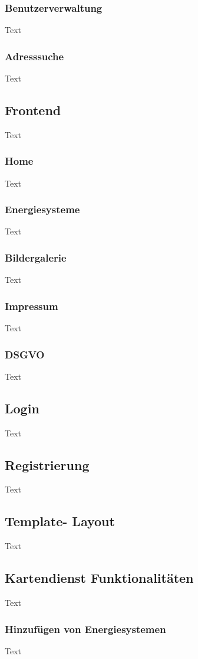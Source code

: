 \subsubsection{Benutzerverwaltung}
Text
\subsubsection{Adresssuche}
Text

\subsection{Frontend}
Text
\subsubsection{Home}
Text
\subsubsection{Energiesysteme}
Text
\subsubsection{Bildergalerie}
Text
\subsubsection{Impressum}
Text
\subsubsection{DSGVO}
Text

\subsection{Login}
Text
\subsection{Registrierung}
Text
\subsection{Template- Layout}
Text
\subsection{Kartendienst Funktionalitäten}
Text
\subsubsection{Hinzufügen von Energiesystemen}
Text

